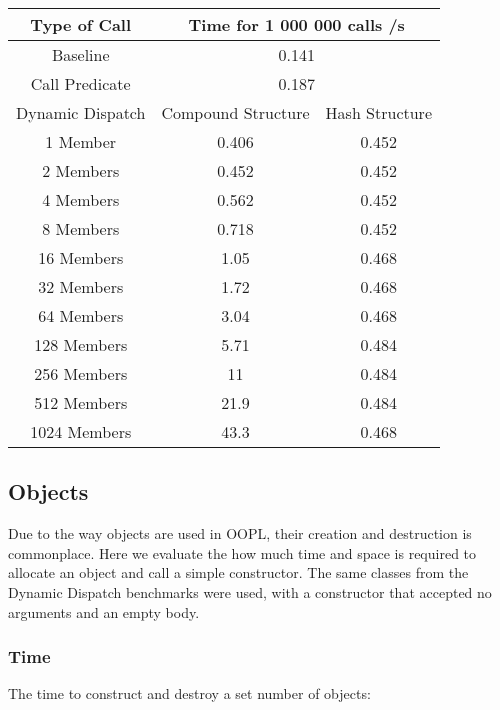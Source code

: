 \documentclass[12pt,a4paper,twoside,openright]{report}
\begin{document}
\begin{center}
\begin{tabular}{c|c|c}
Type of Call & \multicolumn{2}{c}{Time for 1 000 000 calls /s} \\
\hline
Baseline&\multicolumn{2}{c}{0.141}\\
Call Predicate&\multicolumn{2}{c}{0.187}\\
\hline
Dynamic Dispatch&Compound Structure & Hash Structure \\
\hline
1 Member&0.406	&0.452\\
2 Members&0.452&0.452\\
4 Members&0.562&0.452\\
8 Members&0.718&0.452\\
16 Members&1.05&0.468\\
32 Members&1.72&0.468\\
64 Members&3.04&0.468\\
128 Members&5.71&0.484\\
256 Members&11&0.484\\
512 Members&21.9&0.484\\
1024 Members&43.3&0.468\\
\end{tabular}
\end{center}

\subsection{Objects}

Due to the way objects are used in OOPL, their creation and destruction is commonplace. Here we evaluate the how much time and space is required to allocate an object and call a simple constructor. The same classes from the Dynamic Dispatch benchmarks were used, with a constructor that accepted no arguments and an empty body.

\subsubsection{Time}

The time to construct and destroy a set number of objects:
\end{document}
